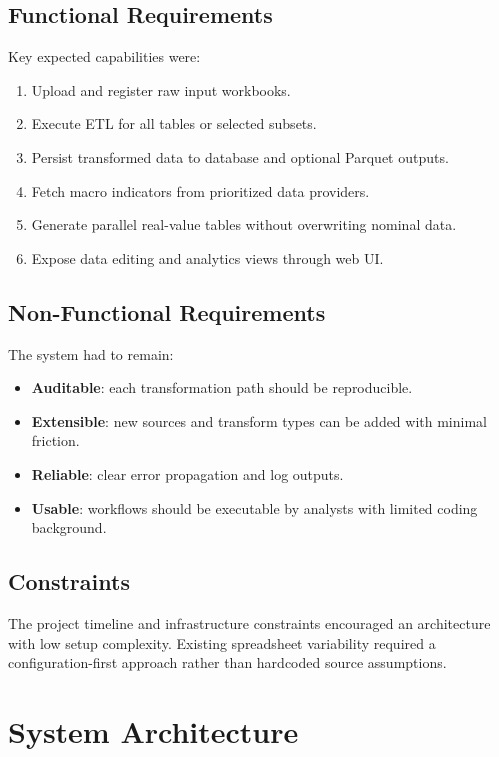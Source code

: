 \documentclass[12pt,a4paper]{report}
\begin{document}
\section{Functional Requirements}
Key expected capabilities were:
\begin{enumerate}[leftmargin=1.5em]
  \item Upload and register raw input workbooks.
  \item Execute ETL for all tables or selected subsets.
  \item Persist transformed data to database and optional Parquet outputs.
  \item Fetch macro indicators from prioritized data providers.
  \item Generate parallel real-value tables without overwriting nominal data.
  \item Expose data editing and analytics views through web UI.
\end{enumerate}

\section{Non-Functional Requirements}
The system had to remain:
\begin{itemize}[leftmargin=1.5em]
  \item \textbf{Auditable}: each transformation path should be reproducible.
  \item \textbf{Extensible}: new sources and transform types can be added with minimal friction.
  \item \textbf{Reliable}: clear error propagation and log outputs.
  \item \textbf{Usable}: workflows should be executable by analysts with limited coding background.
\end{itemize}

\section{Constraints}
The project timeline and infrastructure constraints encouraged an architecture with low setup complexity. Existing spreadsheet variability required a configuration-first approach rather than hardcoded source assumptions.

\chapter{System Architecture}
\end{document}
